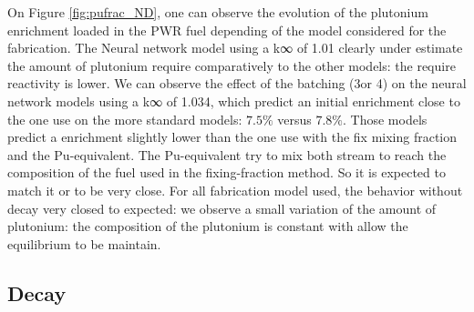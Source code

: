 \documentclass[10pt]{article}
\begin{document}
On Figure \ref{fig:pufrac_ND}, one can observe the evolution of the plutonium
enrichment loaded in the PWR fuel depending of the model considered for the
fabrication.
The Neural network model using a k∞ of 1.01 clearly under estimate the amount of
plutonium require comparatively to the other models: the require reactivity is
lower. We can observe the effect of the batching (3or 4) on the
neural network models using a k∞ of 1.034, which predict an initial enrichment
close to the one use on the more standard models: $7.5\%$ versus $7.8\%$. Those
models predict a enrichment slightly lower than the one use with the fix mixing
fraction and the Pu-equivalent.
The Pu-equivalent try to mix both stream to reach the composition of the fuel
used in the fixing-fraction method. So it is expected to match it or to be very
close.
For all fabrication model used, the behavior without decay very closed to
expected: we observe a small variation of the amount of plutonium: the
composition of the plutonium is constant with allow the equilibrium to be
maintain. 


\subsection{Decay}
\end{document}
